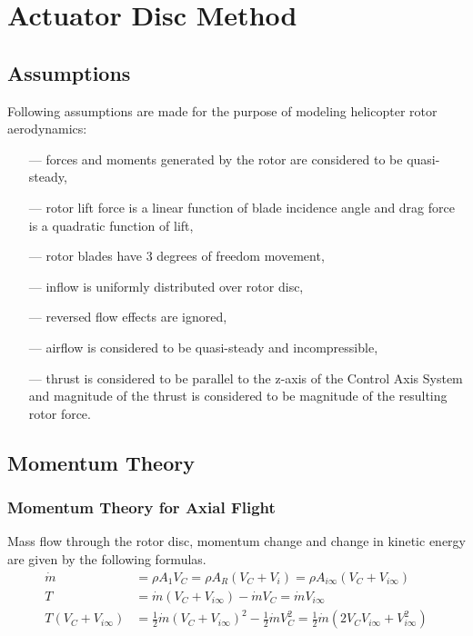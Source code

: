 \chapter{Actuator Disc Method}

\section{Assumptions}

Following assumptions are made for the purpose of modeling helicopter rotor aerodynamics:
\begin{itemize}
  \item[---] forces and moments generated by the rotor are considered to be quasi-steady,
  \item[---] rotor lift force is a linear function of blade incidence angle and drag force is a quadratic function of lift, \cite{Padfield2007}
  \item[---] rotor blades have 3 degrees of freedom movement,
  \item[---] inflow is uniformly distributed over rotor disc, \cite{Padfield2007}
  \item[---] reversed flow effects are ignored,
  \item[---] airflow is considered to be quasi-steady and incompressible,
  \item[---] thrust is considered to be parallel to the z-axis of the Control Axis System and magnitude of the thrust is considered to be magnitude of the resulting rotor force. \cite{GessowMyers1985}
\end{itemize}

\section{Momentum Theory}

\subsection{Momentum Theory for Axial Flight}

Mass flow through the rotor disc, momentum change and change in kinetic energy are given by the following formulas. \cite{Padfield2007}
\begin{align}
  \label{eq-aero-mass-flow}
  \dot m
  &=
  \rho A_1 V_C = \rho A_R \left( V_C + V_i \right)
  =
  \rho A_{i \infty} \left( V_C + V_{i \infty}  \right) \\
  \label{eq-aero-thrust-1}
  T
  &=
  \dot m \left( V_C + V_{i \infty} \right)
  -
  \dot m V_C = \dot m V_{ i \infty } \\
  T \left( V_C + V_{ i \infty } \right)
  &=
  \frac{1}{2} \dot m \left( V_C + V_{ i \infty } \right)^2
  -
  \frac{1}{2} \dot m V_C^2
  =
  \frac{1}{2} \dot m \left( 2V_C V_{ i \infty } + V_{ i \infty }^2 \right)
\end{align}

